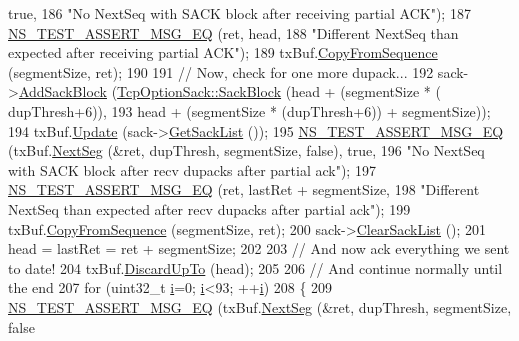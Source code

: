 \begin{DoxyCode}
{      true},
186                          \textcolor{stringliteral}{"No NextSeq with SACK block after receiving partial ACK"});
187   \hyperlink{group__testing_ga2a9d78cffb3db8e867c35fff0b698cf5}{NS\_TEST\_ASSERT\_MSG\_EQ} (ret, head,
188                          \textcolor{stringliteral}{"Different NextSeq than expected after receiving partial ACK"});
189   txBuf.\hyperlink{classns3_1_1TcpTxBuffer_a5eb9c889cfad2cd11a5ccf996c506fd3}{CopyFromSequence} (segmentSize, ret);
190 
191   \textcolor{comment}{// Now, check for one more dupack...}
192   sack->\hyperlink{classns3_1_1TcpOptionSack_ab7fe631445815bbb5f5bd2e7d6fd2662}{AddSackBlock} (\hyperlink{classns3_1_1TcpOptionSack_a9e1d07d8729fd3ac5ead7305794675c3}{TcpOptionSack::SackBlock} (head + (segmentSize * (
      dupThresh+6)),
193                                                 head + (segmentSize * (dupThresh+6)) + segmentSize));
194   txBuf.\hyperlink{classns3_1_1TcpTxBuffer_abed2d31821b2d946068c517195f5cc61}{Update} (sack->\hyperlink{classns3_1_1TcpOptionSack_a08840a554682aeb3aadbccfbb1f6b6fa}{GetSackList} ());
195   \hyperlink{group__testing_ga2a9d78cffb3db8e867c35fff0b698cf5}{NS\_TEST\_ASSERT\_MSG\_EQ} (txBuf.\hyperlink{classns3_1_1TcpTxBuffer_ad08eadd0ba92849a4c4a6920b72acb69}{NextSeg} (&ret, dupThresh, segmentSize, \textcolor{keyword}{false}), \textcolor{keyword}{
      true},
196                          \textcolor{stringliteral}{"No NextSeq with SACK block after recv dupacks after partial ack"});
197   \hyperlink{group__testing_ga2a9d78cffb3db8e867c35fff0b698cf5}{NS\_TEST\_ASSERT\_MSG\_EQ} (ret, lastRet + segmentSize,
198                          \textcolor{stringliteral}{"Different NextSeq than expected after recv dupacks after partial ack"});
199   txBuf.\hyperlink{classns3_1_1TcpTxBuffer_a5eb9c889cfad2cd11a5ccf996c506fd3}{CopyFromSequence} (segmentSize, ret);
200   sack->\hyperlink{classns3_1_1TcpOptionSack_ab5f3634e6e86fa9df061596696d130c5}{ClearSackList} ();
201   head = lastRet = ret + segmentSize;
202 
203   \textcolor{comment}{// And now ack everything we sent to date!}
204   txBuf.\hyperlink{classns3_1_1TcpTxBuffer_ad145a6de0122b3400fcbbff030d2acea}{DiscardUpTo} (head);
205 
206   \textcolor{comment}{// And continue normally until the end}
207   \textcolor{keywordflow}{for} (uint32\_t \hyperlink{bernuolliDistribution_8m_a6f6ccfcf58b31cb6412107d9d5281426}{i}=0; \hyperlink{bernuolliDistribution_8m_a6f6ccfcf58b31cb6412107d9d5281426}{i}<93; ++\hyperlink{bernuolliDistribution_8m_a6f6ccfcf58b31cb6412107d9d5281426}{i})
208     \{
209       \hyperlink{group__testing_ga2a9d78cffb3db8e867c35fff0b698cf5}{NS\_TEST\_ASSERT\_MSG\_EQ} (txBuf.\hyperlink{classns3_1_1TcpTxBuffer_ad08eadd0ba92849a4c4a6920b72acb69}{NextSeg} (&ret, dupThresh, segmentSize, \textcolor{keyword}{false}

\end{DoxyCode}
